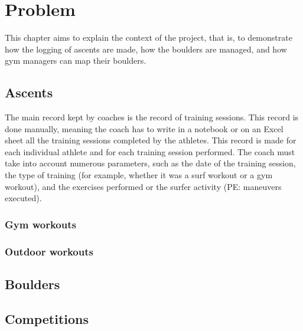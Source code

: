 %
%
\chapter{Problem} \label{cap:Problem}

This chapter aims to explain the context of the project, that is, to demonstrate how the logging of ascents are made, how the boulders are managed, and how gym managers can map their boulders.


\section{Ascents}

The main record kept by coaches is the record of training sessions. This record is done
manually, meaning the coach has to write in a notebook or on an Excel sheet all the training
sessions completed by the athletes. This record is made for each individual athlete and for
each training session performed. The coach must take into account numerous parameters,
such as the date of the training session, the type of training (for example, whether it was
a surf workout or a gym workout), and the exercises performed or the surfer activity (PE:
maneuvers executed).




\subsection{Gym workouts}

\subsection{Outdoor workouts}

\section{Boulders}
\lipsum[3-5]



\section{Competitions}

